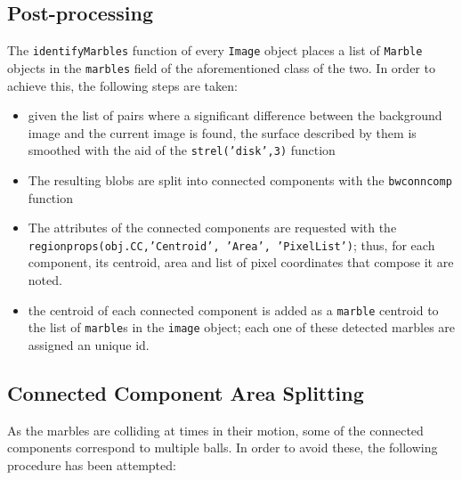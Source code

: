 \documentclass[10pt,a4paper,onecolumn]{report}
\begin{document}
\subsection{Post-processing}

The \texttt{identifyMarbles} function of every \texttt{Image} object places a list of \texttt{Marble} objects in the \texttt{marbles} field of the aforementioned class of the two. In order to achieve this, the following steps are taken:

\begin{itemize}
\item given the list of pairs where a significant difference between the background image and the current image is found, the surface described by them is smoothed with the aid of the \texttt{strel('disk',3)} function

\item The resulting blobs are split into connected components with the \texttt{bwconncomp} function

\item The attributes of the connected components are requested with the\\ \texttt{regionprops(obj.CC,'Centroid', 'Area', 'PixelList')}; thus, for each component, its centroid, area and list of pixel coordinates that compose it are noted.

\item the centroid of each connected component is added as a \texttt{marble} centroid to the list of \texttt{marble}s in the \texttt{image} object; each one of these detected marbles are assigned an unique id.
\end{itemize}

\subsection{Connected Component Area Splitting}
As the marbles are colliding at times in their motion, some of the connected components correspond to multiple balls. In order to avoid these, the following procedure has been attempted:
\end{document}
